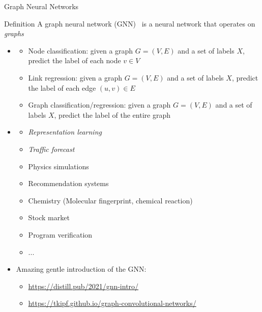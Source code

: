 \documentclass[presentation, 9pt]{beamer}\mode<presentation>{\usetheme{AMSBolognaFC}}
\begin{document}
\begin{frame}{Graph Neural Networks}
\begin{alertblock}{Definition}
	A graph neural network (GNN)~ is a neural network that operates on \textit{graphs}
\end{alertblock}
\begin{itemize}
	\item {}
	\begin{itemize}
		\item Node classification: given a graph $G=(V,E)$ and a set of labels $X$, predict the label of each node $v \in V$
		\item Link regression: given a graph $G=(V,E)$ and a set of labels $X$, predict the label of each edge $(u,v) \in E$
		\item Graph classification/regression: given a graph $G=(V,E)$ and a set of labels $X$, predict the label of the entire graph
	\end{itemize}
	\item {}
	\begin{itemize}
		\item \emph{Representation learning}~
		\item \emph{Traffic forecast}~
		\item Physics simulations~
		\item Recommendation systems~
		\item Chemistry (Molecular fingerprint, chemical reaction)~
		\item Stock market~
		\item Program verification~
		\item ...
	\end{itemize}
	\item Amazing gentle introduction of the GNN: 
	\begin{itemize}
		\item \url{https://distill.pub/2021/gnn-intro/}
		\item \url{https://tkipf.github.io/graph-convolutional-networks/}
	\end{itemize}
\end{itemize}
\end{frame}
\end{document}
